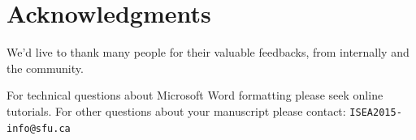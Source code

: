 \documentclass[letterpaper]{article}
\begin{document}
\section{Acknowledgments}
We'd live to thank many people for their valuable feedbacks, from internally and the community.


For technical questions about Microsoft Word formatting please seek online tutorials. For other questions about your manuscript please contact: {\tt ISEA2015-info@sfu.ca}




\end{document}
